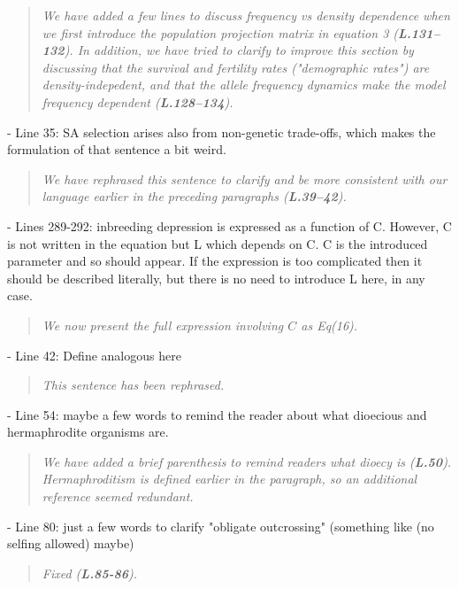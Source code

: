 \documentclass[11pt]{article}
\begin{document}
\begin{quote}
	{\itshape We have added a few lines to discuss frequency vs density dependence when we first introduce the population projection matrix in equation 3 ({\bf L.131--132}). In addition, we have tried to clarify to improve this section by discussing that the survival and fertility rates ("demographic rates") are density-indepedent, and that the allele frequency dynamics make the model frequency dependent ({\bf L.128--134}).}
\end{quote}

- Line 35: SA selection arises also from non-genetic trade-offs, which makes the formulation of that sentence a bit weird.

\begin{quote}
	{\itshape We have rephrased this sentence to clarify and be more consistent with our language earlier in the preceding paragraphs ({\bf L.39--42}).}
\end{quote}

- Lines 289-292: inbreeding depression is expressed as a function of C. However, C is not written in the equation but L which depends on C. C is the introduced parameter and so should appear. If the expression is too complicated then it should be described literally, but there is no need to introduce L here, in any case.

\begin{quote}
	{\itshape We now present the full expression involving $C$ as Eq(16).}
\end{quote}

- Line 42: Define analogous here

\begin{quote}
	{\itshape This sentence has been rephrased.}
\end{quote}

- Line 54: maybe a few words to remind the reader about what dioecious and hermaphrodite organisms are.

\begin{quote}
	{\itshape We have added a brief parenthesis to remind readers what dioecy is ({\bf L.50}). Hermaphroditism is defined earlier in the paragraph, so an additional reference seemed redundant.}
\end{quote}

- Line 80: just a few words to clarify "obligate outcrossing" (something like (no selfing allowed) maybe)

\begin{quote}
	{\itshape Fixed ({\bf L.85-86}).}
\end{quote}
\end{document}
